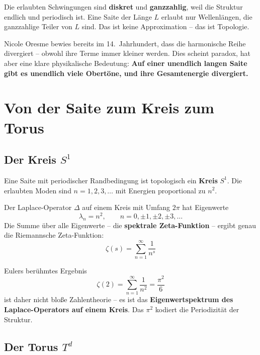 	\begin{keypoint}
		Die erlaubten Schwingungen sind \textbf{diskret} und \textbf{ganzzahlig}, weil die Struktur endlich und periodisch ist. Eine Saite der Länge $L$ erlaubt nur Wellenlängen, die ganzzahlige Teiler von $L$ sind. Das ist keine Approximation -- das ist Topologie.
	\end{keypoint}
	
	Nicole Oresme bewies bereits im 14.~Jahrhundert, dass die harmonische Reihe divergiert -- obwohl ihre Terme immer kleiner werden. Dies scheint paradox, hat aber eine klare physikalische Bedeutung: \textbf{Auf einer unendlich langen Saite gibt es unendlich viele Obertöne, und ihre Gesamtenergie divergiert.}
	
	
	\section{Von der Saite zum Kreis zum Torus}
	
	\subsection{Der Kreis $S^1$}
	
	Eine Saite mit periodischer Randbedingung ist topologisch ein \textbf{Kreis} $S^1$. Die erlaubten Moden sind $n = 1, 2, 3, \ldots$ mit Energien proportional zu $n^2$.
	
	Der Laplace-Operator $\Delta$ auf einem Kreis mit Umfang $2\pi$ hat Eigenwerte
	\begin{equation}
		\lambda_n = n^2, \qquad n = 0, \pm 1, \pm 2, \pm 3, \ldots
	\end{equation}
	Die Summe über alle Eigenwerte -- die \textbf{spektrale Zeta-Funktion} -- ergibt genau die Riemannsche Zeta-Funktion:
	\begin{equation}
		\zeta(s) = \sum_{n=1}^{\infty} \frac{1}{n^s}
	\end{equation}
	
	Eulers berühmtes Ergebnis
	\begin{equation}
		\zeta(2) = \sum_{n=1}^{\infty} \frac{1}{n^2} = \frac{\pi^2}{6}
		\label{eq:basel}
	\end{equation}
	ist daher nicht bloße Zahlentheorie -- es ist das \textbf{Eigenwertspektrum des Laplace-Operators auf einem Kreis}. Das $\pi^2$ kodiert die Periodizität der Struktur.
	
	\subsection{Der Torus $T^d$}
	
